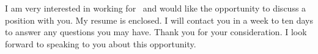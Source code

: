 \documentclass{my_cv}
\begin{document}
I am very interested in working for \companyName \  and would like the
opportunity to discuss a position with you.  My resume is enclosed. 
I will contact you in a week to ten days to answer any questions
you may have. Thank you for your consideration.  I look forward to
speaking to you about this opportunity. 

\makeletterclosing
\end{document}
